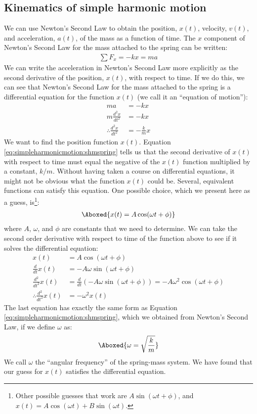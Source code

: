 \subsection{Kinematics of simple harmonic motion}
We can use Newton's Second Law to obtain the position, $x(t)$, velocity, $v(t)$, and acceleration, $a(t)$, of the mass as a function of time. The $x$ component of Newton's Second Law for the mass attached to the spring can be written:
\begin{align*}
\sum F_x = -kx = ma
\end{align*}
We can write the acceleration in Newton's Second Law more explicitly as the second derivative of the position, $x(t)$, with respect to time. If we do this, we can see that Newton's Second Law for the mass attached to the spring is a differential equation for the function $x(t)$ (we call it an ``equation of motion''):
\begin{align}
\label{eq:simpleharmonicmotion:shmspring}
ma &= -kx\nonumber\\
m\frac{d^2x}{dt^2} &= -kx\nonumber\\
\therefore \frac{d^2x}{dt^2} &= -\frac{k}{m}x
\end{align}
We want to find the position function $x(t)$. Equation {\ref{eq:simpleharmonicmotion:shmspring}} tells us that the second derivative of $x(t)$ with respect to time must equal the negative of the $x(t)$ function multiplied by a constant, $k/m$. Without having taken a course on differential equations, it might not be obvious what the function $x(t)$ could be. Several, equivalent functions can satisfy this equation. One possible choice, which we present here as a guess, is\footnote{Other possible guesses that work are $A \sin(\omega t + \phi)$, and $x(t) = A\cos(\omega t) + B\sin(\omega t)$.}:
\begin{align}
\Aboxed{x(t) = A \cos(\omega t + \phi)}
\end{align}
where $A$, $\omega$, and $\phi$ are constants that we need to determine. We can take the second order derivative with respect to time of the function above to see if it solves the differential equation:
\begin{align*}
x(t) &= A \cos(\omega t + \phi)\\
\frac{d}{dt}x(t) &= -A\omega\sin(\omega t + \phi)\\
\frac{d^2}{dt^2}x(t) &=\frac{d}{dt}\left( -A\omega\sin(\omega t + \phi)\right)= -A\omega^2\cos(\omega t + \phi)\\
\therefore \frac{d^2}{dt^2}x(t) &= - \omega^2 x(t)
\end{align*}
The last equation has exactly the same form as Equation \ref{eq:simpleharmonicmotion:shmspring}, which we obtained from Newton's Second Law, if we define $\omega$ as:
\begin{align}
\Aboxed{\omega = \sqrt{\frac{k}{m}}}
\end{align}
We call $\omega$ the ``angular frequency'' of the spring-mass system. We have found that our guess for $x(t)$ satisfies the differential equation. 

